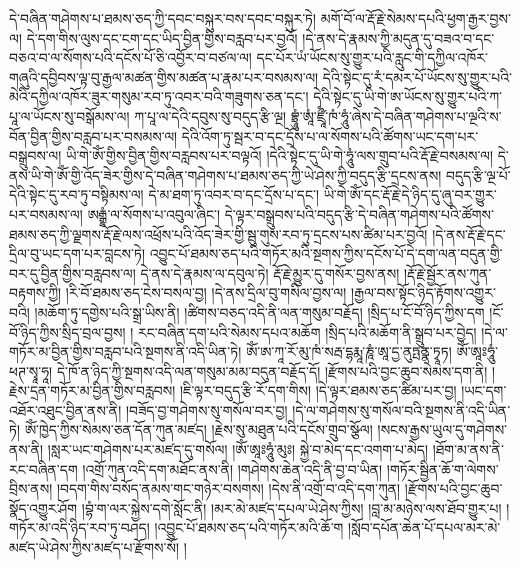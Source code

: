 དེ་བཞིན་གཤེགས་པ་ཐམས་ཅད་ཀྱི་དབང་བསྐུར་བས་དབང་བསྐུར་ཏེ། མགོ་བོ་ལ་རྡོ་རྗེ་སེམས་དཔའི་ཕྱག་རྒྱར་བྱས་ལ། དེ་དག་གིས་ལུས་དང་ངག་དང་ཡིད་བྱིན་གྱིས་བརླབ་པར་བྱའོ། །དེ་ནས་དེ་རྣམས་ཀྱི་མདུན་དུ་བཟའ་བ་དང་བཅའ་བ་ལ་སོགས་པའི་དངོས་པོ་ཅི་འབྱོར་བ་བཙལ་ལ། དང་པོར་ཡཾ་ཡོངས་སུ་གྱུར་པའི་རླུང་གི་དཀྱིལ་འཁོར་གཞུའི་དབྱིབས་ལྟ་བུ་རྒྱལ་མཚན་གྱིས་མཚན་པ་རྣམ་པར་བསམས་ལ། དེའི་སྟེང་དུ་རཾ་དམར་པོ་ཡོངས་སུ་གྱུར་པའི་མེའི་དཀྱིལ་འཁོར་ཟུར་གསུམ་རབ་ཏུ་འབར་བའི་གཟུགས་ཅན་དང་། དེའི་སྟེང་དུ་ཡི་གེ་ཨ་ཡོངས་སུ་གྱུར་པའི་ཀ་པཱ་ལ་ཡོངས་སུ་བསྒོམས་ལ། ཀ་པཱ་ལ་དེའི་དབུས་སུ་བདུད་རྩི་ལྔ། བྷྲཱུཾ་ཨཱཾ་ཛྲཱྀཾ་ཁཾ་ཧཱུཾ་ཞེས་དེ་བཞིན་གཤེགས་པ་ལྔའི་ས་བོན་བྱིན་གྱིས་བརླབ་པར་བསམས་ལ། དེའི་འོག་ཏུ་སྦར་བ་དང་དྲོས་པ་ལ་སོགས་པའི་ཚོགས་ཡང་དག་པར་བསྒྲུབས་ལ། ཡི་གེ་ཨོཾ་གྱིས་བྱིན་གྱིས་བརླབས་པར་བལྟའོ། །དེའི་སྟེང་དུ་ཡི་གེ་ཧཱུཾ་ལས་གྲུབ་པའི་རྡོ་རྗེ་བསམས་ལ། དེ་ནས་ཡི་གེ་ཨོཾ་གྱི་འོད་ཟེར་གྱིས་དེ་བཞིན་གཤེགས་པ་ཐམས་ཅད་ཀྱི་ཡེ་ཤེས་ཀྱི་བདུད་རྩི་དྲངས་ནས། བདུད་རྩི་ལྔ་པོ་དེའི་སྟེང་དུ་རབ་ཏུ་བསྟིམས་ལ། དེ་མ་ཐག་ཏུ་འབར་བ་དང་དྲོས་པ་དང་། ཡི་གེ་ཨོཾ་དང་རྡོ་རྗེ་དེ་ཉིད་དུ་ཞུ་བར་གྱུར་པར་བསམས་ལ། ཨརྒྷཾ་ལ་སོགས་པ་འབུལ་ཞིང་། དེ་ལྟར་བསྒྲུབས་པའི་བདུད་རྩི་དེ་བཞིན་གཤེགས་པའི་ཚོགས་ཐམས་ཅད་ཀྱི་ལྗགས་རྡོ་རྗེ་ལས་འཕྲོས་པའི་འོད་ཟེར་གྱི་སྦུ་གུས་རབ་ཏུ་དྲངས་པས་ཚིམ་པར་བྱའོ། །དེ་ནས་རྡོ་རྗེ་དང་དྲིལ་བུ་ཡང་དག་པར་བླངས་ཏེ། འབྱུང་པོ་ཐམས་ཅད་པའི་གཏོར་མའི་སྔགས་ཀྱིས་དངོས་པོ་དེ་དག་ལན་བདུན་གྱི་བར་དུ་བྱིན་གྱིས་བརླབས་ལ། དེ་ནས་དེ་རྣམས་ལ་དབུལ་ཏེ། རྡོ་རྗེ་མྱུར་དུ་གསོར་བྱས་ནས། །རྡོ་རྗེ་སྦྱོར་ནས་ཀུན་བརྟགས་ཀྱི། །རི་བོ་ཐམས་ཅད་ངེས་བསལ་བྱ། །དེ་ནས་དྲིལ་བུ་གསིལ་བྱས་ལ། །རྒྱལ་བས་སྟོང་ཉིད་རྟོགས་འགྱུར་བའི། །མཆོག་ཏུ་དགྱེས་པའི་སྒྲ་ཡིས་ནི། །ཚིགས་བཅད་འདི་ནི་ལན་གསུམ་བརྗོད། །སྲིད་པ་ངོ་བོ་ཉིད་ཀྱིས་དག །ངོ་བོ་ཉིད་ཀྱིས་སྲིད་བྲལ་བྱས། །
རང་བཞིན་དག་པའི་སེམས་དཔའ་མཆོག །སྲིད་པའི་མཆོག་ནི་སྒྲུབ་པར་བྱེད། །དེ་ལ་གཏོར་མ་བྱིན་གྱིས་བརླབ་པའི་སྔགས་ནི་འདི་ཡིན་ཏེ། ཨོཾ་ཨ་ཀཱ་རོ་མུ་ཁཾ་སརྦ་དྷརྨཱ་ཎཱཾ་ཨཱ་དྱ་ནུཏྤནྣ་ཏྭཱཏ། ཨོཾ་ཨཱཿཧཱུཾ་ཕཊ་སྭཱ་ཧཱ། དེ་ཁོ་ན་ཉིད་ཀྱི་སྔགས་འདི་ལན་གསུམ་མམ་བདུན་བརྗོད་དོ། །རྫོགས་པའི་བྱང་ཆུབ་སེམས་དག་ནི། །རྗེས་དྲན་གཏོར་མ་བྱིན་གྱིས་བརླབས། །ཇི་ལྟར་བདུད་རྩི་རོ་དག་གིས། །དེ་ལྟར་ཐམས་ཅད་ཚིམ་པར་བྱ། །ཡང་དག་འཐོར་འཐུང་བྱིན་ནས་ནི། །བཟོད་བྱ་གཤེགས་སུ་གསོལ་བར་བྱ། །དེ་ལ་གཤེགས་སུ་གསོལ་བའི་སྔགས་ནི་འདི་ཡིན་ཏེ། ཨོཾ་ཁྱེད་ཀྱིས་སེམས་ཅན་དོན་ཀུན་མཛད། །རྗེས་སུ་མཐུན་པའི་དངོས་གྲུབ་སྩོལ། །སངས་རྒྱས་ཡུལ་དུ་གཤེགས་ནས་ནི། །སླར་ཡང་གཤེགས་པར་མཛད་དུ་གསོལ། །ཨོཾ་ཨཱཿཧཱུཾ་མུཿ། སྐྱེ་བ་མེད་དང་འགག་པ་མེད། །ཐོག་མ་ནས་ནི་རང་བཞིན་དག །འགྲོ་ཀུན་འདི་དག་མཐོང་ནས་ནི། །གཤེགས་ཆེན་འདི་ནི་བྱ་བ་ཡིན། །གཏོར་སྦྱིན་ཆོ་ག་ལེགས་བྲིས་ནས། །བདག་གིས་བསོད་ནམས་གང་གཉེར་བསགས། །དེས་ནི་འགྲོ་བ་འདི་དག་ཀུན། །རྫོགས་པའི་བྱང་ཆུབ་སྣོད་འགྱུར་ཤོག །བྷཾ་ག་ལར་སྐྱེས་དགེ་སློང་ནི། །མར་མེ་མཛད་དཔལ་ཡེ་ཤེས་ཀྱིས། །བླ་མ་མཉེས་ལས་ཐོབ་གྱུར་པ། །གཏོར་མ་འདི་ཉིད་རབ་ཏུ་བཤད། །འབྱུང་པོ་ཐམས་ཅད་པའི་གཏོར་མའི་ཆོ་ག །སློབ་དཔོན་ཆེན་པོ་དཔལ་མར་མེ་མཛད་ཡེ་ཤེས་ཀྱིས་མཛད་པ་རྫོགས་སོ། །